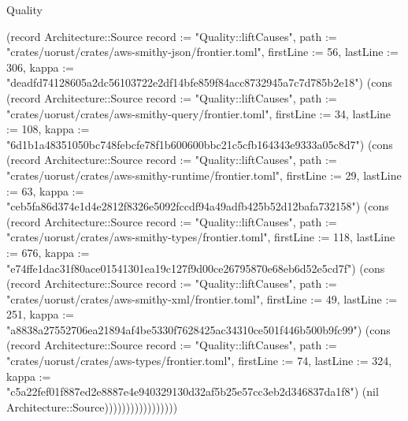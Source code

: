 \begin{lexlean}{Quality}
\begin{semanticmodule}
{(record Architecture::Source {record := "Quality::liftCauses", path := "crates/uorust/crates/aws-smithy-json/frontier.toml", firstLine := 56, lastLine := 306, kappa := "deadfd74128605a2dc56103722e2df14bfe859f84acc8732945a7c7d785b2e18"}) (cons (record Architecture::Source {record := "Quality::liftCauses", path := "crates/uorust/crates/aws-smithy-query/frontier.toml", firstLine := 34, lastLine := 108, kappa := "6d1b1a48351050bc748febcfe78f1b600600bbc21c5cfb164343e9333a05c8d7"}) (cons (record Architecture::Source {record := "Quality::liftCauses", path := "crates/uorust/crates/aws-smithy-runtime/frontier.toml", firstLine := 29, lastLine := 63, kappa := "ceb5fa86d374e1d4e2812f8326e5092fccdf94a49adfb425b52d12bafa732158"}) (cons (record Architecture::Source {record := "Quality::liftCauses", path := "crates/uorust/crates/aws-smithy-types/frontier.toml", firstLine := 118, lastLine := 676, kappa := "e74ffe1dac31f80ace01541301ea19c127f9d00ce26795870e68eb6d52e5cd7f"}) (cons (record Architecture::Source {record := "Quality::liftCauses", path := "crates/uorust/crates/aws-smithy-xml/frontier.toml", firstLine := 49, lastLine := 251, kappa := "a8838a27552706ea21894af4be5330f7628425ac34310ce501f446b500b9fc99"}) (cons (record Architecture::Source {record := "Quality::liftCauses", path := "crates/uorust/crates/aws-types/frontier.toml", firstLine := 74, lastLine := 324, kappa := "c5a22fef01f887ed2e8887e4e940329130d32af5b25e57cc3eb2d346837da1f8"}) (nil Architecture::Source)))))))))))))))))
}


\end{semanticmodule}
\end{lexlean}
